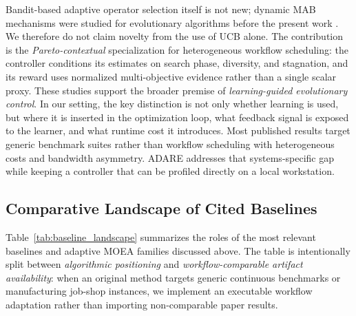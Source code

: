 \documentclass[runningheads]{llncs}
\begin{document}
Bandit-based adaptive operator selection itself is not new; dynamic MAB mechanisms were studied for evolutionary algorithms before the present work \cite{dacosta2008aos,fialho2010aos}. We therefore do not claim novelty from the use of UCB alone. The contribution is the \emph{Pareto-contextual} specialization for heterogeneous workflow scheduling: the controller conditions its estimates on search phase, diversity, and stagnation, and its reward uses normalized multi-objective evidence rather than a single scalar proxy. These studies support the broader premise of \emph{learning-guided evolutionary control}. In our setting, the key distinction is not only whether learning is used, but where it is inserted in the optimization loop, what feedback signal is exposed to the learner, and what runtime cost it introduces. Most published results target generic benchmark suites rather than workflow scheduling with heterogeneous costs and bandwidth asymmetry. ADARE addresses that systems-specific gap while keeping a controller that can be profiled directly on a local workstation.

\subsection{Comparative Landscape of Cited Baselines}
Table~\ref{tab:baseline_landscape} summarizes the roles of the most relevant baselines and adaptive MOEA families discussed above. The table is intentionally split between \emph{algorithmic positioning} and \emph{workflow-comparable artifact availability}: when an original method targets generic continuous benchmarks or manufacturing job-shop instances, we implement an executable workflow adaptation rather than importing non-comparable paper results.
\end{document}
